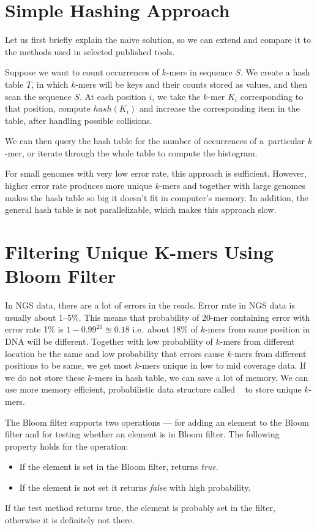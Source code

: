 \section{Simple Hashing Approach}

Let us first briefly explain the naive solution, so we can extend and compare it to the methods used in selected published tools.

Suppose we want to count occurrences of $k$-mers in sequence $S$.
We create a hash table $T$, in which $k$-mers will be keys and their counts stored as values, and then scan the sequence $S$.
At each position $i$, we take the $k$-mer $K_i$ corresponding to that  position, compute $hash(K_i)$ and increase the corresponding item in the table, after handling possible collisions.

We can then query the hash table for the number of occurrences of a~particular $k$-mer, or iterate through the whole table to compute the histogram.

For small genomes with very low error rate, this approach is sufficient. However, higher error rate produces more unique $k$-mers and together with large genomes makes the hash table so big it doesn't fit in computer's memory. In addition, the general hash table is not parallelizable, which makes this approach slow.

\section[Filtering Unique K-mers]{Filtering Unique K-mers Using Bloom Filter}

In NGS data, there are a lot of errors in the reads. Error rate in NGS data is usually about 1--5\%. This means that probability of 20-mer containing error with error rate 1\% is $1 - 0.99^{20} \approxeq 0.18$ i.e.\ about 18\% of $k$-mers from same position in DNA will be different. Together with low probability of $k$-mers from different location be the same and low probability that errors cause $k$-mers from different positions to be same, we get most $k$-mers unique in low to mid coverage data. If we do not store these $k$-mers in hash table, we can save a lot of memory. We can use more memory efficient, probabilistic data structure called ~\cite{bloomfilter} to store unique $k$-mers.

The Bloom filter supports two operations ---  for adding an element to the Bloom filter and  for testing whether an element is in Bloom filter. The following property holds for the  operation:
\begin{itemize}
  \item If the element is set in the Bloom filter, returns \emph{true}.
  \item If the element is not set it returns \emph{false} with high probability.
\end{itemize}
If the test method returns true, the element is probably set in the filter, otherwise it is definitely not there.

